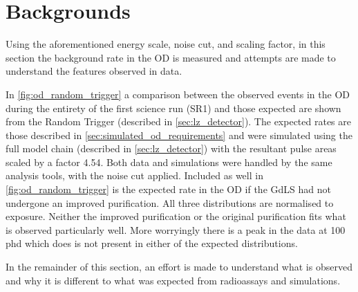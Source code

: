 \section{Backgrounds}
\label{sec:od_analysis_backgrounds}
\par
Using the aforementioned energy scale, noise cut, and scaling factor, in this section the background rate in the OD is measured and attempts are made to understand the features observed in data.
\par
In \autoref{fig:od_random_trigger} a comparison between the observed events in the OD during the entirety of the first science run (SR1) and those expected are shown from the Random Trigger (described in \autoref{sec:lz_detector}).
The expected rates are those described in \autoref{sec:simulated_od_requirements} and were simulated using the full model chain (described in \autoref{sec:lz_detector}) with the resultant pulse areas scaled by a factor 4.54.
Both data and simulations were handled by the same analysis tools, with the noise cut applied.
Included as well in \autoref{fig:od_random_trigger} is the expected rate in the OD if the GdLS had not undergone an improved purification.
All three distributions are normalised to exposure.
Neither the improved purification or the original purification fits what is observed particularly well.
More worryingly there is a peak in the data at 100 phd which does is not present in either of the expected distributions.
\par
In the remainder of this section, an effort is made to understand what is observed and why it is different to what was expected from radioassays and simulations.




